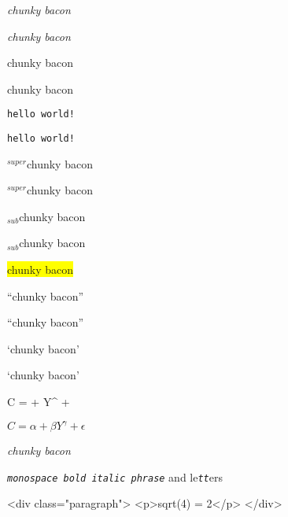 
\emph{chunky bacon}

\emph{chunky bacon}

chunky bacon

chunky bacon

{\tt hello world!}

{\tt hello world!}

${}^{super}$chunky bacon

${}^{super}$chunky bacon

${}_{sub}$chunky bacon

${}_{sub}$chunky bacon

\colorbox{yellow}{ chunky bacon}

``chunky bacon''

``chunky bacon''

`chunky bacon'

`chunky bacon'

C = \alpha + \beta Y^{\gamma} + \epsilon

$C = \alpha + \beta Y^{\gamma} + \epsilon$

\emph{chunky bacon}

{\tt \emph{monospace bold italic phrase}} and le{\tt \emph{tt}}ers

<div class="paragraph">
<p>sqrt(4) = 2</p>
</div>
